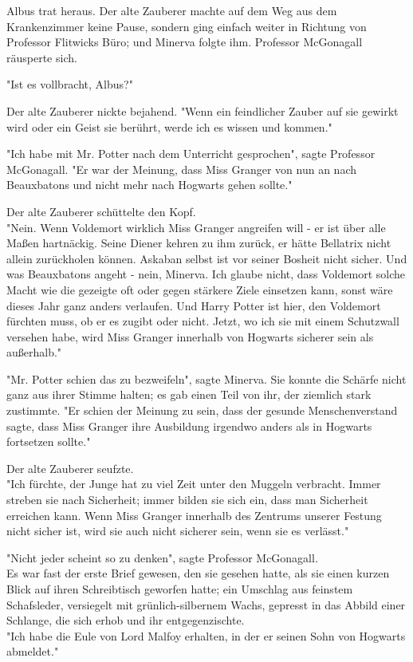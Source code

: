 {Albus trat heraus. Der alte Zauberer machte auf dem Weg aus dem Krankenzimmer keine Pause, sondern ging einfach weiter in Richtung von Professor Flitwicks Büro; und Minerva folgte ihm. Professor McGonagall räusperte sich.

"Ist es vollbracht, Albus?"

Der alte Zauberer nickte bejahend. "Wenn ein feindlicher Zauber auf sie gewirkt wird oder ein Geist sie berührt, werde ich es wissen und kommen."

"Ich habe mit Mr. Potter nach dem Unterricht gesprochen", sagte Professor McGonagall. "Er war der Meinung, dass Miss Granger von nun an nach Beauxbatons und nicht mehr nach Hogwarts gehen sollte."

Der alte Zauberer schüttelte den Kopf.\\ "Nein. Wenn Voldemort wirklich Miss Granger angreifen will - er ist über alle Maßen hartnäckig. Seine Diener kehren zu ihm zurück, er hätte Bellatrix nicht allein zurückholen können. Askaban selbst ist vor seiner Bosheit nicht sicher. Und was Beauxbatons angeht - nein, Minerva. Ich glaube nicht, dass Voldemort solche Macht wie die gezeigte oft oder gegen stärkere Ziele einsetzen kann, sonst wäre dieses Jahr ganz anders verlaufen. Und Harry Potter ist hier, den Voldemort fürchten muss, ob er es zugibt oder nicht. Jetzt, wo ich sie mit einem Schutzwall versehen habe, wird Miss Granger innerhalb von Hogwarts sicherer sein als außerhalb."

"Mr. Potter schien das zu bezweifeln", sagte Minerva. Sie konnte die Schärfe nicht ganz aus ihrer Stimme halten; es gab einen Teil von ihr, der ziemlich stark zustimmte. "Er schien der Meinung zu sein, dass der gesunde Menschenverstand sagte, dass Miss Granger ihre Ausbildung irgendwo anders als in Hogwarts fortsetzen sollte."

Der alte Zauberer seufzte.\\ "Ich fürchte, der Junge hat zu viel Zeit unter den Muggeln verbracht. Immer streben sie nach Sicherheit; immer bilden sie sich ein, dass man Sicherheit erreichen kann. Wenn Miss Granger innerhalb des Zentrums unserer Festung nicht sicher ist, wird sie auch nicht sicherer sein, wenn sie es verlässt."

"Nicht jeder scheint so zu denken", sagte Professor McGonagall.\\ Es war fast der erste Brief gewesen, den sie gesehen hatte, als sie einen kurzen Blick auf ihren Schreibtisch geworfen hatte; ein Umschlag aus feinstem Schafsleder, versiegelt mit grünlich-silbernem Wachs, gepresst in das Abbild einer Schlange, die sich erhob und ihr entgegenzischte.\\ "Ich habe die Eule von Lord Malfoy erhalten, in der er seinen Sohn von Hogwarts abmeldet."

}
